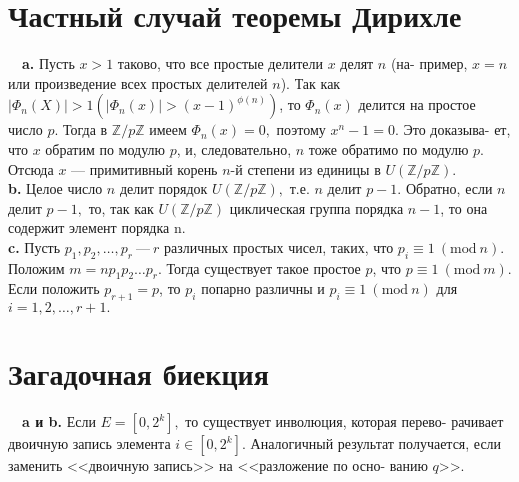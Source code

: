 \documentclass{mai_book}
\begin{document}
\section{Частный случай теоремы Дирихле}
\indent~~\textbf{a.} Пусть $x>1$ таково, что все простые делители $x$ делят $n$ (на-\linebreak
пример, $x=n$ или произведение всех простых делителей $n$). Так как\linebreak
$|\Phi_n(X)|>1(|\Phi_n(x)|>(x-1)^{\phi(n)})$, то $\Phi_n(x)$ делится на простое число $p$.\linebreak
Тогда в $\mathbb{Z}/p\mathbb{Z}$ имеем $\Phi_n(x)=0,$ поэтому $x^n-1=0$. Это доказыва-\linebreak
ет, что $x$ обратим по модулю $p$, и, следовательно, $n$ тоже обратимо по\linebreak
модулю $p$. Отсюда $x$ --- примитивный корень $n$-й степени из  единицы\linebreak
в $U(\mathbb{Z}/p\mathbb{Z}).$ \\
\indent\textbf{b.} Целое число $n$ делит порядок $U(\mathbb{Z}/p\mathbb{Z}),$ т.е. $n$ делит $p-1.$ Обратно,\linebreak
если $n$ делит $p-1,$ то, так как $U(\mathbb{Z}/p\mathbb{Z})$ циклическая группа порядка\linebreak
$n-1$, то она содержит элемент порядка n. \\
\indent\textbf{c.} Пусть $p_1,p_2,\ldots,p_r~ \text{---}~ r$ различных простых чисел, таких, что\linebreak
$p_i\equiv 1 ~(\text{mod}~n).$ Положим $m=np_1p_2\ldots p_r.$ Тогда существует такое\linebreak
простое $p$, что $p\equiv 1~ (\text{mod}~m).$ Если положить $p_{r+1}=p$, то $p_i$ попарно\linebreak
различны и $p_i\equiv 1~ (\text{mod}~n)$ для $i=1,2,\ldots,r+1.$ 
\section{Загадочная биекция} 
\indent~~\textbf{a и b.} Если  $E=[0,2^k],$ то существует инволюция, которая перево-\linebreak
рачивает двоичную запись элемента $i\in [0,2^k].$ Аналогичный результат\linebreak
получается, если заменить <<двоичную запись>> на <<разложение по осно-\linebreak
ванию $q$>>.
\end{document}
